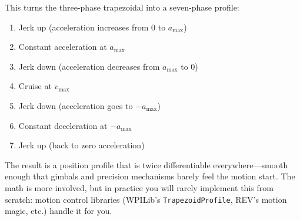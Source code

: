 This turns the three-phase trapezoidal into a seven-phase profile:
\begin{enumerate}[nosep]
    \item Jerk up (acceleration increases from 0 to $a_{\max}$)
    \item Constant acceleration at $a_{\max}$
    \item Jerk down (acceleration decreases from $a_{\max}$ to 0)
    \item Cruise at $v_{\max}$
    \item Jerk down (acceleration goes to $-a_{\max}$)
    \item Constant deceleration at $-a_{\max}$
    \item Jerk up (back to zero acceleration)
\end{enumerate}

The result is a position profile that is twice differentiable everywhere---smooth enough that gimbals and precision mechanisms barely feel the motion start. The math is more involved, but in practice you will rarely implement this from scratch: motion control libraries (WPILib's \texttt{TrapezoidProfile}, REV's motion magic, etc.) handle it for you.

